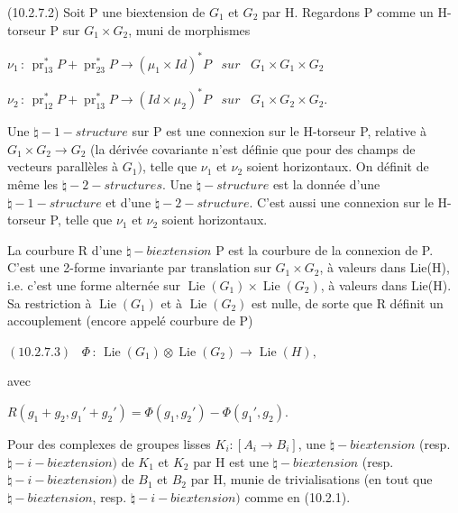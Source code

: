 \documentclass[11pt,twoside]{article}
\newcommand{\DFormula}[1]{%
  \par\smallskip\noindent\hspace*{0pt}\(\displaystyle #1\)\par\smallskip
}
\begin{document}
(10.2.7.2) Soit P une biextension de \(G_{1}\) et \(G_{2}\) par H. Regardons P comme un H-torseur P sur \(G_{1}\times G_{2}\), muni de morphismes\par
\par\medskip
\DFormula{\nu _{1}\,:\,\operatorname{pr}_{13}^{\ast }P+\operatorname{pr}_{23}^{\ast }P\to (\mu _{1}\times Id)^{\ast }P\,\,\,\,\,sur\,\,\,\,\,G_{1}\times G_{1}\times G_{2}}
\DFormula{\nu _{2}\,:\,\operatorname{pr}_{12}^{\ast }P+\operatorname{pr}_{13}^{\ast }P\to (Id\times \mu _{2})^{\ast }P\,\,\,\,\,sur\,\,\,\,\,G_{1}\times G_{2}\times G_{2}.}
\par\medskip
Une \(\natural -1-structure\) sur P est une connexion sur le H-torseur P, relative à \(G_{1}\times G_{2}\to G_{2}\) (la dérivée covariante n’est définie que pour des champs de vecteurs parallèles à \(G_{1})\), telle que \(\nu _{1}\) et \(\nu _{2}\) soient horizontaux. On définit de même les \(\natural -2-structures\). Une \(\natural -structure\) est la donnée d’une \(\natural -1-structure\) et d’une \(\natural -2-structure\). C’est aussi une connexion sur le H-torseur P, telle que \(\nu _{1}\) et \(\nu _{2}\) soient horizontaux.\par
\par\medskip
La courbure R d’une \(\natural -biextension\) P est la courbure de la connexion de P. C’est une 2-forme invariante par translation sur \(G_{1}\times G_{2}\), à valeurs dans Lie(H), i.e. c’est une forme alternée sur \(\operatorname{Lie}(G_{1})\times \operatorname{Lie}(G_{2})\), à valeurs dans Lie(H). Sa restriction à \(\operatorname{Lie}(G_{1})\) et à \(\operatorname{Lie}(G_{2})\) est nulle, de sorte que R définit un accouplement (encore appelé courbure de P)\par
\par\medskip
\DFormula{(10.2.7.3)\,\,\,\,\,\Phi \,:\,\operatorname{Lie}(G_{1})\otimes \operatorname{Lie}(G_{2})\to \operatorname{Lie}(H),}
\par\medskip
avec\par
\par\medskip
\DFormula{R(g_{1}+g_{2},g_{1}′+g_{2}′)=\Phi (g_{1},g_{2}′)−\Phi (g_{1}′,g_{2}).}
\par\medskip
Pour des complexes de groupes lisses \(K_{i}:[A_{i}\to B_{i}]\), une \(\natural -biextension\) (resp. \(\natural -i-biextension)\) de \(K_{1}\) et \(K_{2}\) par H est une \(\natural -biextension\) (resp. \(\natural -i-biextension)\) de \(B_{1}\) et \(B_{2}\) par H, munie de trivialisations (en tout que \(\natural -biextension\), resp. \(\natural -i-biextension)\) comme en (10.2.1).\par
\end{document}
